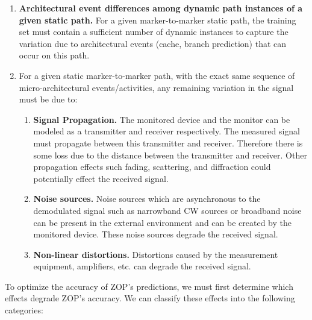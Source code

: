 \begin{enumerate}
  \begin{comment}
\item \textbf{Differences between static paths.} For a given pair of markers, the training set must contain examples of all the possible static paths between these two markers.
  \end{comment}
  
\item \textbf{Architectural event differences among dynamic path instances of a given static path.} For a given marker-to-marker static path, the training set must contain a sufficient number of dynamic instances to capture the variation due to architectural events (cache, branch prediction) that can occur on this path.

\item For a given static marker-to-marker path, with the exact same sequence of micro-architectural events/activities, any remaining variation in the signal must be due to:
  \begin{enumerate}
    \item \textbf{Signal Propagation.} The monitored device and the monitor can be modeled as a transmitter and receiver respectively. The measured signal must propagate between this transmitter and receiver. Therefore there is some loss due to the distance between the transmitter and receiver. Other propagation effects such fading, scattering, and diffraction could potentially effect the received signal. 
    \item \textbf{Noise sources.} Noise sources which are asynchronous to the demodulated signal such as narrowband CW sources or broadband noise can be present in the external environment and can be created by the monitored device. These noise sources degrade the received signal. 
    \item \textbf{Non-linear distortions.} Distortions caused by the measurement equipment, amplifiers, etc. can degrade the received signal.
  \end{enumerate}
\end{enumerate}


To optimize the accuracy of ZOP's predictions, we must first determine which effects degrade ZOP's accuracy. We can classify these effects into the following categories:


